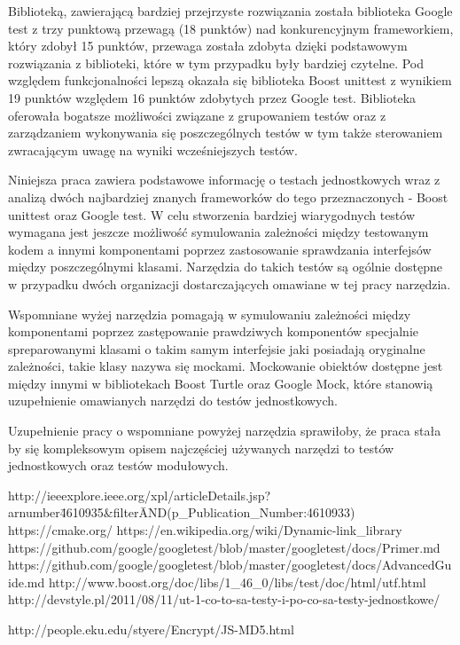 \documentclass[12pt,a4paper,notitlepage]{report}
\begin{document}
	Biblioteką, zawierającą bardziej przejrzyste rozwiązania została biblioteka Google test z trzy punktową przewagą (18 punktów) nad konkurencyjnym frameworkiem, który zdobył 15 punktów, przewaga została zdobyta dzięki podstawowym rozwiązania z biblioteki, które w tym przypadku były bardziej czytelne. Pod względem funkcjonalności lepszą okazała się biblioteka Boost unittest z wynikiem 19 punktów względem 16 punktów zdobytych przez Google test. Biblioteka oferowała bogatsze możliwości związane z grupowaniem testów oraz z zarządzaniem wykonywania się poszczególnych testów w tym także sterowaniem zwracającym uwagę na wyniki wcześniejszych testów.

	Niniejsza praca zawiera podstawowe informację o testach jednostkowych wraz z analizą dwóch najbardziej znanych frameworków do tego przeznaczonych - Boost unittest oraz Google test. W celu stworzenia bardziej wiarygodnych testów wymagana jest jeszcze możliwość symulowania zależności między testowanym kodem a innymi komponentami poprzez zastosowanie sprawdzania interfejsów między poszczególnymi klasami. Narzędzia do takich testów są ogólnie dostępne w przypadku dwóch organizacji dostarczających omawiane w tej pracy narzędzia.

	Wspomniane wyżej narzędzia pomagają w symulowaniu zależności między komponentami poprzez zastępowanie prawdziwych komponentów specjalnie spreparowanymi klasami o takim samym interfejsie jaki posiadają oryginalne zależności, takie klasy nazywa się mockami. Mockowanie obiektów dostępne jest między innymi w bibliotekach Boost Turtle oraz Google Mock, które stanowią uzupełnienie omawianych narzędzi do testów jednostkowych.

	Uzupełnienie pracy o wspomniane powyżej narzędzia sprawiłoby, że praca stała by się kompleksowym opisem najczęściej używanych narzędzi to testów jednostkowych oraz testów modułowych.


	\begin{thebibliography}{1}
		 http://ieeexplore.ieee.org/xpl/articleDetails.jsp?arnumber\=4610935\&filter\=AND(p{\_}Publication{\_}Number:4610933)
		 https://cmake.org/
		 https://en.wikipedia.org/wiki/Dynamic-link{\_}library
	  	 https://github.com/google/googletest/blob/master/googletest/docs/Primer.md
	  	 https://github.com/google/googletest/blob/master/googletest/docs/AdvancedGuide.md
	  	 http://www.boost.org/doc/libs/1{\_}46{\_}0/libs/test/doc/html/utf.html
	  	 http://devstyle.pl/2011/08/11/ut-1-co-to-sa-testy-i-po-co-sa-testy-jednostkowe/

	  	 http://people.eku.edu/styere/Encrypt/JS-MD5.html
	 \end{thebibliography}
\end{document}
